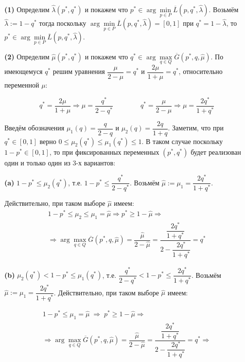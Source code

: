 \textbf{(1)} Определим $\hat \lambda(p^*, q^*)$ и покажем что 
$p^* \in \arg \min \limits_{p \in P} \overline L(p, q^*, \hat \lambda)$.
Возьмём $\hat \lambda := 1 - q^*$ тогда поскольку 
$\arg \min\limits_{p \in P} \overline L(p, q^*, \hat \lambda) = [0,1]$ 
при $ q^* = 1 - \hat \lambda$, 
то $p^* \in \arg \min \limits_{p \in P} \overline L(p, q^*, \hat \lambda)$.

\textbf{(2)} Определим $\hat \mu(p^*, q^*)$ и покажем что 
$q^* \in \arg \max \limits_{q \in Q} \overline G(p^*, q, \hat \mu) $.
По имеющемуся $q^*$ решим уравнения $\dfrac{\mu}{2 - \mu}=q^*$ и
$\dfrac{2 \mu}{1 + \mu}=q^*$, относительно переменной $\mu$:

$$
	q^*=\dfrac{2 \mu}{1 + \mu} \Rightarrow \mu = \frac{q^*}{2 - q^*} \qquad \qquad
	q^*=\dfrac{\mu}{2 - \mu} \Rightarrow \mu = \frac{2 q^*}{1 + q^*}
$$

Введём обозначения $\mu_1(q) = \dfrac{q}{2 - q}$ и 
$\mu_2(q) = \dfrac{2 q}{1 + q}$. Заметим, что при $q^* \in [0, 1]$ 
верно $0 \leqslant \mu_2(q^*) \leqslant \mu_1(q^*) \leqslant 1$.
В таком случае поскольку $1 - p^* \in [0, 1]$, то при фиксированных переменных 
$(p^*, q^*)$ будет реализован один и только один из 3-х вариантов:

\textbf{(a)}
$1 - p^* \leqslant \mu_2(q^*)$, т.е.  $1 - p^* \leqslant \dfrac{q^*}{2 - q^*}$.
Возьмём $\hat \mu := \mu_1 = \dfrac{2 q^*}{1 + q^*}$.

Действительно, при таком выборе $\hat{\mu}$ имеем: 
\begin{gather*}
	1 - p^* \leqslant \mu_2 \leqslant \mu_1 = \hat \mu \Rightarrow
	p^* \geqslant 1 - \hat \mu \Rightarrow 
	\\	
	\Rightarrow \arg \max \limits_{q \in Q} \overline G(p^*, q, \hat \mu) =
	\dfrac{\hat{\mu}}{2-\hat{\mu}} =
	\dfrac{\dfrac{2 q^*}{1 + q^*}}{2 - \dfrac{2 q^*}{1 + q^*}} =
	q^*
\end{gather*} 


\textbf{(b)}
$\mu_2(q^*) < 1-p^* \leqslant \mu_1(q^*)$, т.е.  
$\dfrac{q^*}{2 - q^{*}} < 1 - p^* \leqslant \dfrac{2 q^*}{1 + q^*}$.
Возьмём $\hat \mu := \mu_1 = \dfrac{2 q^*}{1 + q^*}$.
Действительно, при таком выборе $\hat \mu$ имеем:

\begin{gather*}
	1 - p^* \leq \mu_1 = \hat \mu 
	\; \Rightarrow \;
	p^* \geqslant 1 - \hat \mu \Rightarrow 
	\\
	\Rightarrow  \arg \max \limits_{q \in Q} \overline G(p^*, q, \hat \mu) =
	\dfrac{\hat \mu}{2 - \hat \mu} =
	\dfrac{\dfrac{2 q^*}{1 + q^*}}{2 - \dfrac{2 q^*}{1 + q^*}}=
	q^* \Rightarrow
\end{gather*} 




